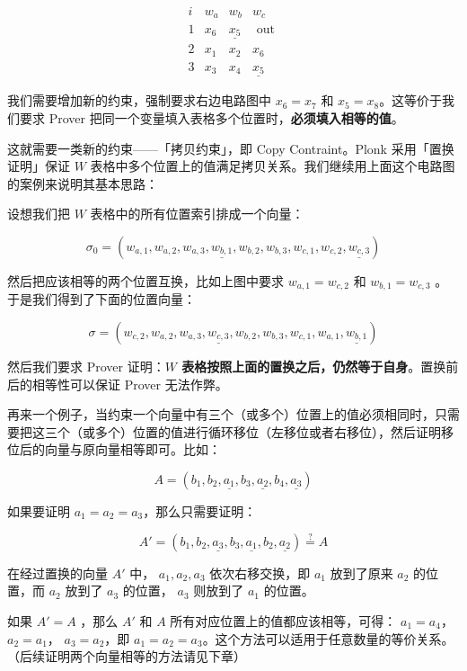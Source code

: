 $$
\begin{array}{c|c|c|c|}
i & w_a & w_b & w_c \\
\hline 1 & \boxed{x_6} & \underline{x_5} & \text { out } \\
2 & x_1 & x_2 & \boxed{x_6} \\
3 & x_3 & x_4 & \underline{x_5}
\end{array}
$$

我们需要增加新的约束，强制要求右边电路图中 \(x_6=x_7\) 和
\(x_5=x_8\)。这等价于我们要求 Prover
把同一个变量填入表格多个位置时，\textbf{必须填入相等的值}。

这就需要一类新的约束------「拷贝约束」，即 Copy Contraint。Plonk
采用「置换证明」保证 \(W\)
表格中多个位置上的值满足拷贝关系。我们继续用上面这个电路图的案例来说明其基本思路：

设想我们把 \(W\) 表格中的所有位置索引排成一个向量：

\[
\sigma_0=(\boxed{w_{a,1}}, w_{a,2}, w_{a,3}, \underline{w_{b,1}}, w_{b,2}, w_{b,3}, w_{c,1}, \boxed{w_{c,2}}, \underline{w_{c,3}})
\]

然后把应该相等的两个位置互换，比如上图中要求 \(w_{a,1}=w_{c,2}\) 和
\(w_{b,1}=w_{c,3}\) 。于是我们得到了下面的位置向量：

\[
\sigma=(\boxed{w_{c,2}}, w_{a,2}, w_{a,3}, \underline{w_{c,3}}, w_{b,2}, w_{b,3}, w_{c,1}, \boxed{w_{a,1}}, \underline{w_{b,1}})
\]

然后我们要求 Prover 证明：\textbf{\(W\)
表格按照上面的置换之后，仍然等于自身}。置换前后的相等性可以保证 Prover
无法作弊。

再来一个例子，当约束一个向量中有三个（或多个）位置上的值必须相同时，只需要把这三个（或多个）位置的值进行循环移位（左移位或者右移位），然后证明移位后的向量与原向量相等即可。比如：

\[
A = (b_1, b_2, \underline{a_1}, b_3, \underline{a_2}, b_4, \underline{a_3})
\]

如果要证明 \(a_1=a_2=a_3\)，那么只需要证明：

\[
A' =  (b_1, b_2, \underline{a_3}, b_3, \underline{a_1}, b_2, \underline{a_2}) \overset{?}{=} A
\]

在经过置换的向量 \(A'\) 中， \(a_1, a_2, a_3\) 依次右移交换，即 \(a_1\)
放到了原来 \(a_2\) 的位置，而 \(a_2\) 放到了 \(a_3\) 的位置， \(a_3\)
则放到了 \(a_1\) 的位置。

如果 \(A'=A\) ，那么 \(A'\) 和 \(A\)
所有对应位置上的值都应该相等，可得： \(a_1=a_4\)， \(a_2=a_1\)，
\(a_3=a_2\)，即
\(a_1=a_2=a_3\)。这个方法可以适用于任意数量的等价关系。（后续证明两个向量相等的方法请见下章）

